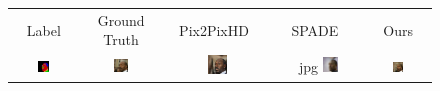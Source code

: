 \addtolength{\tabcolsep}{-4.5pt}    
\bgroup
\def\arraystretch{0.5}%
\begin{figure}[]
\begin{tabular} {cc|cc|c}
 Label & Ground Truth & Pix2PixHD~\cite{wang2018pix2pixHD} &  SPADE~\cite{park2019SPADE} & Ours\\

\includegraphics[width=0.1932\textwidth]{Images/Rec/Faces/label/28360.png} & \includegraphics[width=0.1932\textwidth]{Images/Rec/Faces/gt/28360.jpg} &
\includegraphics[width=0.1932\textwidth]{Images/Rec/Faces/pix2pixhd/28360.jpg}&jpg
\includegraphics[width=0.1932\textwidth]{Images/Rec/Faces/spade/28360.jpg} &  \includegraphics[width=0.1932\textwidth]{Images/Rec/Faces/ours/28360.png} \\


\end{tabular}
\end{figure}
